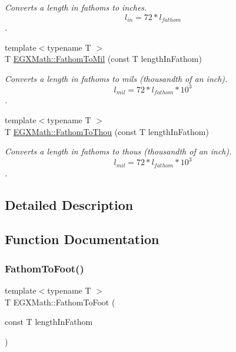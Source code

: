 \begin{DoxyCompactItemize}
\begin{DoxyCompactList}\small\item\em Converts a length in fathoms to inches. \[ l_{in}=72 * l_{fathom} \]. \end{DoxyCompactList}\item 
{\footnotesize template$<$typename T $>$ }\\T \mbox{\hyperlink{group___e_g_x_math-_conversions-_length_conversions-_imperial-_fathom-_imperial_ga1bdfdd0f208b878241772cc584fa4d1d}{E\+G\+X\+Math\+::\+Fathom\+To\+Mil}} (const T length\+In\+Fathom)
\begin{DoxyCompactList}\small\item\em Converts a length in fathoms to mils (thousandth of an inch). \[ l_{mil}=72 * l_{fathom} * 10^{3} \]. \end{DoxyCompactList}\item 
{\footnotesize template$<$typename T $>$ }\\T \mbox{\hyperlink{group___e_g_x_math-_conversions-_length_conversions-_imperial-_fathom-_imperial_ga869f851e88866f34c0dca73f1b69bb21}{E\+G\+X\+Math\+::\+Fathom\+To\+Thou}} (const T length\+In\+Fathom)
\begin{DoxyCompactList}\small\item\em Converts a length in fathoms to thous (thousandth of an inch). \[ l_{mil}=72 * l_{fathom} * 10^{3} \]. \end{DoxyCompactList}\end{DoxyCompactItemize}


\subsection{Detailed Description}


\subsection{Function Documentation}
\mbox{\label{group___e_g_x_math-_conversions-_length_conversions-_imperial-_fathom-_imperial_ga71995f5dd30211dc6c7c601d26a5fec8}} 
\subsubsection{\texorpdfstring{Fathom\+To\+Foot()}{FathomToFoot()}}
{\footnotesize\ttfamily template$<$typename T $>$ \\
T E\+G\+X\+Math\+::\+Fathom\+To\+Foot (\begin{DoxyParamCaption}\item[{const T}]{length\+In\+Fathom }\end{DoxyParamCaption})}



